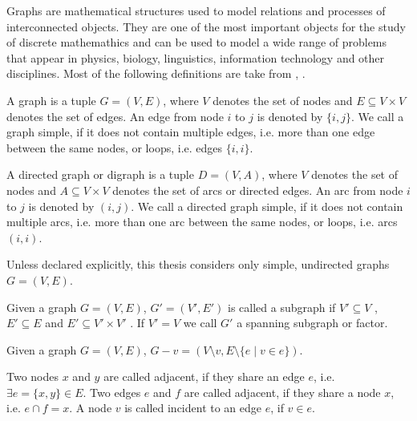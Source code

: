 Graphs are mathematical structures used to model relations and processes of interconnected objects. They are one of the most important objects for the study of discrete mathemathics and can be used to model a wide range of problems that appear in physics, biology, linguistics, information technology and other disciplines. Most of the following definitions are take from \cite{fritz-11}, \cite{gaume-10}.

\begin{definition}[Graph]
A graph is a tuple $G = (V, E)$, where $V$ denotes the set of nodes and $E \subseteq V \times V$ denotes the set of edges. An edge from node $i$ to $j$ is denoted by $\{i, j\}$. We call a graph simple, if it does not contain multiple edges, i.e. more than one edge between the same nodes, or loops, i.e. edges $\{i, i\}$.
\end{definition}

\begin{definition}
A directed graph or digraph is a tuple $D = (V, A)$, where $V$ denotes the set of nodes and $A \subseteq V \times V$ denotes the set of arcs
or directed edges. An arc from node $i$ to $j$ is denoted by $(i, j)$. We call a directed graph simple, if it does not contain multiple arcs, i.e. more than one arc between the same nodes, or loops, i.e. arcs $(i, i)$.
\end{definition}

Unless declared explicitly, this thesis considers only simple, undirected graphs $G = (V, E)$.

\begin{definition}[Subgraph]
Given a graph $G = (V, E)$, $G' = (V', E')$ is called a subgraph if $V' \subseteq V$ , $E' \subseteq E$ and $E' \subseteq V' \times V'$ . If  $V' = V$ we call $G'$ a spanning subgraph or factor.
\end{definition}

\begin{definition}
Given a graph $G = (V, E)$, $G - v = (V \setminus v, E \setminus \{e \mid v \in e\})$.
\end{definition}

\begin{definition}
Two nodes $x$ and $y$ are called adjacent, if they share an edge $e$, i.e. $\exists e = \{x, y\} \in E$. Two edges $e$ and $f$ are called adjacent, if they share a node $x$, i.e. $e \cap f = x$. A node $v$ is called incident to an edge $e$, if $v \in e$.
\end{definition}

